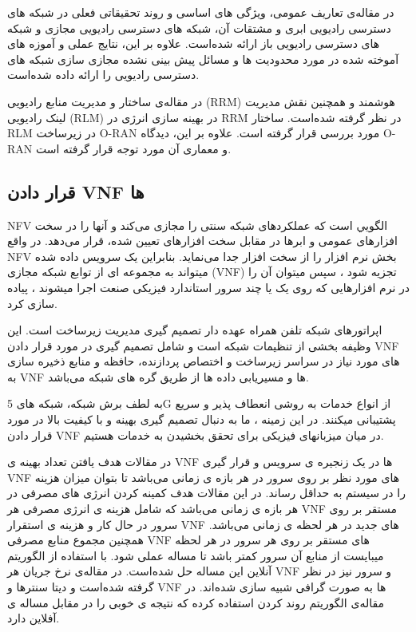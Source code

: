 در مقاله‌ی
\cite{c2o}
تعاریف عمومی، ویژگی های اساسی و روند تحقیقاتی فعلی در شبکه های دسترسی رادیویی ابری و مشتقات آن، شبکه های دسترسی رادیویی مجازی و شبکه های دسترسی رادیویی باز ارائه شده‌است.
علاوه بر این، نتایج عملی و آموزه های آموخته شده در مورد محدودیت ها و مسائل پیش بینی نشده مجازی سازی شبکه های دسترسی رادیویی را ارائه داده شده‌است.

در مقاله‌ی 
\cite{sree2019open, kawahara2019ran}
 ساختار و مدیریت منابع رادیویی (RRM) هوشمند 
 و همچنین نقش مدیریت لینک رادیویی (RLM) در بهینه سازی انرژی در RRM
در نظر گرفته شده‌است.
ساختار RLM در 
زیرساخت O-RAN مورد بررسی قرار گرفته است.
علاوه بر این، دیدگاه
O-RAN
 و معماری آن مورد توجه قرار گرفته است.
\subsection{قرار دادن VNF ها}
NFV
 الگویي است که عملکردهای شبکه سنتی را مجازی می‌کند و آنها را در سخت افزارهای عمومی و ابرها در مقابل سخت افزارهای تعیین شده، قرار می‌دهد.
 در واقع NFV بخش نرم افزار را از سخت افزار جدا می‌نماید.
 بنابراین یک سرویس داده شده میتواند به مجموعه ای از توابع شبکه مجازی (VNF) تجزیه شود ، سپس میتوان آن را در نرم افزارهایی که روی یک یا چند سرور استاندارد فیزیکی صنعت اجرا میشوند ، پیاده سازی کرد.
 
اپراتورهای شبکه تلفن همراه عهده دار تصمیم گیری مدیریت زیرساخت است.
این وظیفه بخشی از تنظیمات شبکه است و شامل تصمیم گیری در مورد قرار دادن VNF های مورد نیاز در سراسر زیرساخت و اختصاص پردازنده، حافظه و منابع ذخیره سازی به VNF ها و مسیریابی داده ها از طریق گره های شبکه
می‌باشد.

به لطف برش شبکه، شبکه های 5G از انواع خدمات به روشی انعطاف پذیر و سریع پشتیبانی میکنند. در این زمینه ، ما به دنبال تصمیم گیری بهینه و با کیفیت بالا در مورد قرار دادن VNF در میان میزبانهای فیزیکی برای تحقق بخشیدن به خدمات هستیم.

در مقالات
\cite{wang2016online,jia2018online,luo2020online}
هدف یافتن تعداد بهینه ی VNF ها در یک زنجیره ی سرویس و قرار گیری VNF های مورد نظر بر روی سرور در هر بازه ی زمانی می‌باشد تا بتوان میزان هزینه را در سیستم به حداقل رساند.
در این مقالات هدف کمینه کردن انرژی های مصرفی در هر بازه ی زمانی می‌باشد که شامل هزینه ی انرژی مصرفی هر VNF مستقر بر روی سرور در حال کار و هزینه ی استقرار VNF های جدید در هر لحظه ی زمانی می‌باشد.
همچنین مجموع منابع مصرفی VNF های مستقر بر روی هر سرور در هر لحظه میبایست از منابع آن سرور کمتر باشد تا مساله عملی شود.
با استفاده از الگوریتم آنلاین این مساله حل شده‌است.‌
در مقاله‌ی 
\cite{jia2018online,luo2020online}
نرخ جریان هر VNF و سرور نیز در نظر گرفته شده‌است و دیتا سنترها و VNF ها به صورت گرافی شبیه سازی شده‌اند.
در مقاله‌ی
\cite{luo2020online}
الگوریتم روند کردن استفاده کرده که نتیجه ی خوبی را در مقابل مساله ی آفلاین دارد.

